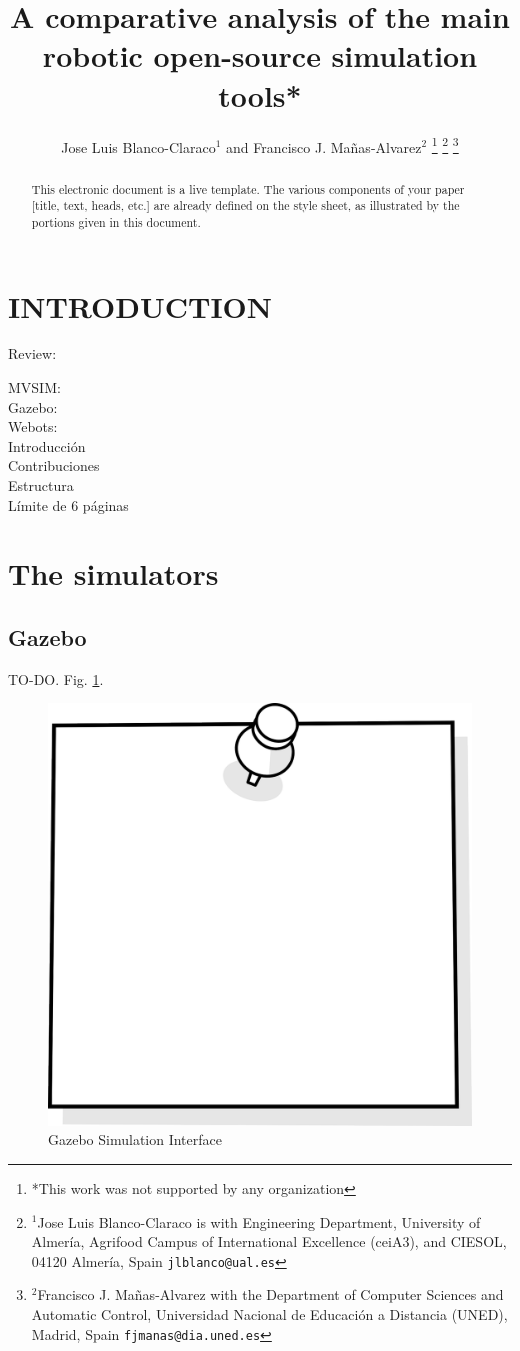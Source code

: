 \documentclass[a4paper, 10pt, conference]{ieeeconf}      %
\title{\LARGE \bf
A comparative analysis of the main robotic open-source simulation tools*
}
\author{Jose Luis Blanco-Claraco$^{1}$ and Francisco J. Mañas-Alvarez$^{2}$%
\thanks{*This work was not supported by any organization}%
\thanks{$^{1}$Jose Luis Blanco-Claraco is with Engineering Department, University of Almería, Agrifood Campus of International Excellence (ceiA3), and CIESOL, 04120 Almería, Spain
        {\tt\small jlblanco@ual.es}}%
\thanks{$^{2}$Francisco J. Mañas-Alvarez with the Department of Computer Sciences and Automatic Control, Universidad Nacional de Educación a Distancia (UNED), Madrid, Spain
        {\tt\small fjmanas@dia.uned.es}}%
}
\begin{document}
\maketitle
\thispagestyle{empty}
\pagestyle{empty}


\begin{abstract}

This electronic document is a live template. The various components of your paper [title, text, heads, etc.] are already defined on the style sheet, as illustrated by the portions given in this document.

\end{abstract}


\section{INTRODUCTION}

Review: \cite{collins2021review}

MVSIM: \cite{blanco2023multivehicle}\\
Gazebo: \cite{koenig2004design}\\
Webots: \cite{michel2004cyberbotics}\\

Introducción\\
Contribuciones\\
Estructura\\
Límite de 6 páginas

\section{The simulators}
\subsection{Gazebo}
TO-DO. Fig. \ref{fig:Gazebo}.
\begin{figure}[thpb]
	\centering
    \includegraphics[width=0.7\columnwidth]{figs/example.png}
    \caption{Gazebo Simulation Interface}
    \label{fig:Gazebo}
\end{figure}
\end{document}
